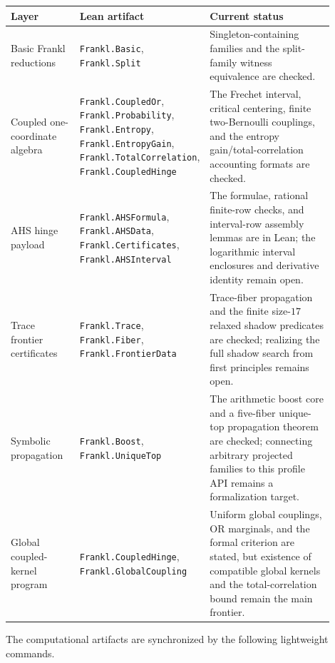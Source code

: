 \documentclass[11pt]{article}
\begin{document}
\begin{center}
\begin{tabular}{p{0.22\linewidth}p{0.24\linewidth}p{0.44\linewidth}}
\textbf{Layer} & \textbf{Lean artifact} & \textbf{Current status} \\
\hline
Basic Frankl reductions &
\texttt{Frankl.Basic}, \texttt{Frankl.Split} &
Singleton-containing families and the split-family witness equivalence are
checked. \\
Coupled one-coordinate algebra &
\texttt{Frankl.CoupledOr}, \texttt{Frankl.Probability},
\texttt{Frankl.Entropy}, \texttt{Frankl.EntropyGain},
\texttt{Frankl.TotalCorrelation}, \texttt{Frankl.CoupledHinge} &
The Frechet interval, critical centering, finite two-Bernoulli couplings, and
the entropy gain/total-correlation accounting formats are checked. \\
AHS hinge payload &
\texttt{Frankl.AHSFormula}, \texttt{Frankl.AHSData},
\texttt{Frankl.Certificates}, \texttt{Frankl.AHSInterval} &
The formulae, rational finite-row checks, and interval-row assembly lemmas are
in Lean; the logarithmic interval enclosures and derivative identity remain
open. \\
Trace frontier certificates &
\texttt{Frankl.Trace}, \texttt{Frankl.Fiber},
\texttt{Frankl.FrontierData} &
Trace-fiber propagation and the finite size-$17$ relaxed shadow predicates are
checked; realizing the full shadow search from first principles remains open. \\
Symbolic propagation &
\texttt{Frankl.Boost}, \texttt{Frankl.UniqueTop} &
The arithmetic boost core and a five-fiber unique-top propagation theorem are
checked; connecting arbitrary projected families to this profile API remains a
formalization target. \\
Global coupled-kernel program &
\texttt{Frankl.CoupledHinge}, \texttt{Frankl.GlobalCoupling} &
Uniform global couplings, OR marginals, and the formal criterion are stated,
but existence of compatible global kernels and the total-correlation bound
remain the main frontier. \\
\end{tabular}
\end{center}

The computational artifacts are synchronized by the following lightweight
commands.
\end{document}
